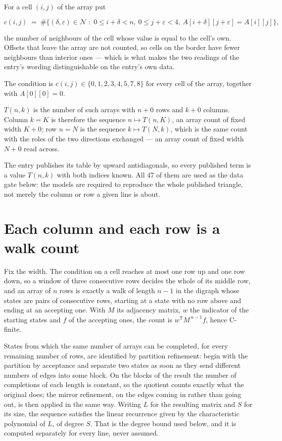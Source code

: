 \documentclass[11pt]{article}
\theoremstyle{definition}
\begin{document}
For a cell $(i,j)$ of the array put

\[c(i,j) \;=\; \#\bigl\{(\delta,\varepsilon)\in\mathcal{N} \;:\; 0\le i+\delta<n,\ 0\le j+\varepsilon<4,\ A[i+\delta][j+\varepsilon] = A[i][j]\bigr\},\]

the number of neighbours of the cell whose value is equal to the cell's own. Offsets that leave the array are not counted, so cells on the border have fewer neighbours than interior ones --- which is what makes the two readings of the entry's wording distinguishable on the entry's own data.

The condition is $c(i,j) \in \{0, 1, 2, 3, 4, 5, 7, 8\}$ for every cell of the array, together with $A[0][0]=0$.

$T(n,k)$ is the number of such arrays with $n + 0$ rows and $k + 0$ columns. Column $k = K$ is therefore the sequence $n \mapsto T(n,K)$, an array count of fixed width $K + 0$; row $n = N$ is the sequence $k \mapsto T(N,k)$, which is the same count with the roles of the two directions exchanged --- an array count of fixed width $N + 0$ read across.

The entry publishes its table by upward antidiagonals, so every published term is a value $T(n,k)$ with both indices known. All 47 of them are used as the data gate below: the models are required to reproduce the whole published triangle, not merely the column or row a given line is about.

\section{Each column and each row is a walk count}

Fix the width. The condition on a cell reaches at most one row up and one row down, so a window of three consecutive rows decides the whole of its middle row, and an array of $n$ rows is exactly a walk of length $n-1$ in the digraph whose states are pairs of consecutive rows, starting at a state with no row above and ending at an accepting one. With $M$ its adjacency matrix, $w$ the indicator of the starting states and $f$ of the accepting ones, the count is $w^{\mathsf T}M^{\,n-1}f$, hence C-finite.

States from which the same number of arrays can be completed, for every remaining number of rows, are identified by partition refinement: begin with the partition by acceptance and separate two states as soon as they send different numbers of edges into some block. On the blocks of the result the number of completions of each length is constant, so the quotient counts exactly what the original does; the mirror refinement, on the edges coming in rather than going out, is then applied in the same way. Writing $L$ for the resulting matrix and $S$ for its size, the sequence satisfies the linear recurrence given by the characteristic polynomial of $L$, of degree $S$. That is the degree bound used below, and it is computed separately for every line, never assumed.
\end{document}
